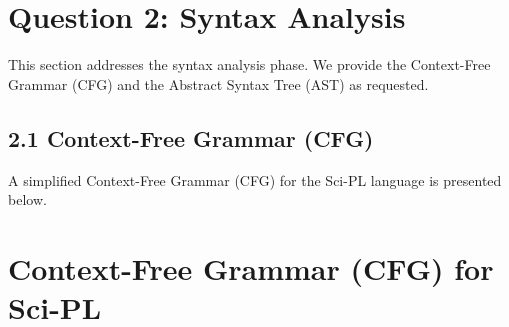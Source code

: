 \documentclass[11pt, letterpaper]{article}
\begin{document}
\section{Question 2: Syntax Analysis}
This section addresses the syntax analysis phase. We provide the Context-Free Grammar (CFG) and the Abstract Syntax Tree (AST) as requested.
\subsection{2.1 Context-Free Grammar (CFG)}
A simplified Context-Free Grammar (CFG) for the Sci-PL language is presented below.

\section*{Context-Free Grammar (CFG) for Sci-PL}
\end{document}
